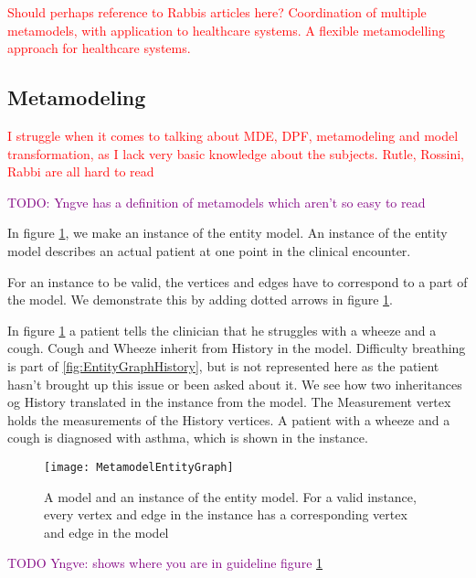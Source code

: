 \textcolor{red}{Should perhaps reference to Rabbis articles here? 
	Coordination	of multiple metamodels, with application	to healthcare systems.
A flexible metamodelling approach for healthcare systems. }

\subsection{Metamodeling}

\textcolor{red}{I struggle when it comes to talking about MDE, DPF, metamodeling and model transformation, as I lack very basic knowledge about the subjects. Rutle, Rossini, Rabbi are all hard to read}

\textcolor{purple}{TODO: Yngve has a definition of metamodels which aren't so easy to read}

In figure \ref{fig:MetamodelEntityGraph}, we make an instance of the entity model. An instance of the entity model describes an actual patient at one point in the clinical encounter. 

For an instance to be valid, the vertices and edges have to correspond to a part of the model. We demonstrate this by adding dotted arrows in figure \ref{fig:MetamodelEntityGraph}. 

In figure \ref{fig:MetamodelEntityGraph} a patient tells the clinician that he struggles with a wheeze and a cough. Cough and Wheeze inherit from History in the model. Difficulty breathing is part of \ref{fig:EntityGraphHistory}, but is not represented here as the patient hasn't brought up this issue or been asked about it. We see how two inheritances og History translated in the instance from the model. The Measurement vertex holds the measurements of the History vertices. A patient with a wheeze and a cough is diagnosed with asthma, which is shown in the instance.

\begin{figure}[h!]
	\texttt{[image: MetamodelEntityGraph]}
	\caption {A model and an instance of the entity model. For a valid instance, every vertex and edge in the instance has a corresponding vertex and edge in the model}
		\label{fig:MetamodelEntityGraph}
\end{figure}

\textcolor{purple}{TODO Yngve: shows where you are in guideline figure \ref{fig:MetamodelEntityGraph}}


